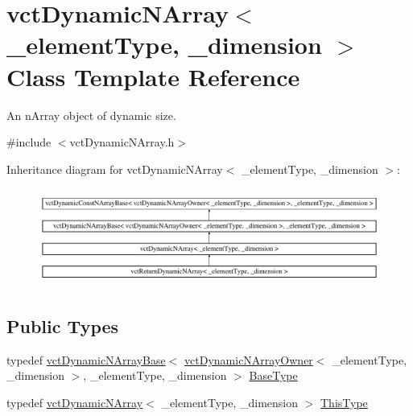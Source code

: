 \hypertarget{classvct_dynamic_n_array}{}\section{vct\+Dynamic\+N\+Array$<$ \+\_\+element\+Type, \+\_\+dimension $>$ Class Template Reference}
\label{classvct_dynamic_n_array}


An n\+Array object of dynamic size.  




{\ttfamily \#include $<$vct\+Dynamic\+N\+Array.\+h$>$}

Inheritance diagram for vct\+Dynamic\+N\+Array$<$ \+\_\+element\+Type, \+\_\+dimension $>$\+:\begin{figure}[H]
\begin{center}
\leavevmode
\includegraphics[height=3.241679cm]{d1/d56/classvct_dynamic_n_array}
\end{center}
\end{figure}
\subsection*{Public Types}
\begin{DoxyCompactItemize}
\item 
typedef \hyperlink{classvct_dynamic_n_array_base}{vct\+Dynamic\+N\+Array\+Base}$<$ \hyperlink{classvct_dynamic_n_array_owner}{vct\+Dynamic\+N\+Array\+Owner}$<$ \+\_\+element\+Type, \+\_\+dimension $>$, \+\_\+element\+Type, \+\_\+dimension $>$ \hyperlink{classvct_dynamic_n_array_adc62cbbc97a16fa388dd96d4404fd075}{Base\+Type}
\item 
typedef \hyperlink{classvct_dynamic_n_array}{vct\+Dynamic\+N\+Array}$<$ \+\_\+element\+Type, \+\_\+dimension $>$ \hyperlink{classvct_dynamic_n_array_a159dfdd698115f12caf629f7539029f5}{This\+Type}
\end{DoxyCompactItemize}
